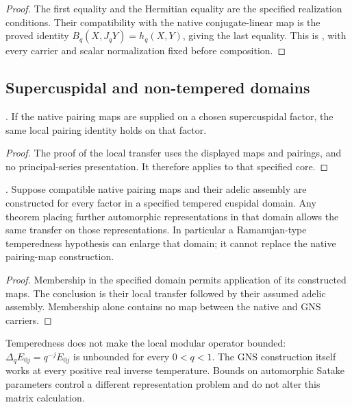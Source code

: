 \begin{proof}
The first equality and the Hermitian equality are the specified
realization conditions. Their compatibility with the native
conjugate-linear map is the proved identity
$B_q(X,J_qY)=h_q(X,Y)$, giving the last equality. This is
, with every carrier
and scalar normalization fixed before composition.
\end{proof}

\subsection{Supercuspidal and non-tempered domains}
\label{v4-arith:kms-gns:cycle2:supercuspidal}
\label{v4-arith:kms-gns:cycle2:ramanujan}

\begin{corollary}
\label{v4-arith:kms-gns:lem:supercuspidal}
\ClaimStatusProvedHereConditional. If the native pairing maps
are supplied on a chosen supercuspidal factor, the same local
pairing identity holds on that factor.
\end{corollary}
\begin{proof}
The proof of the local transfer uses the displayed maps and
pairings, and no principal-series presentation. It therefore
applies to that specified core.
\end{proof}

\begin{proposition}
\label{v4-arith:kms-gns:prop:non-tempered-residue}
\ClaimStatusProvedHereConditional. Suppose compatible native
pairing maps and their adelic assembly are constructed for every
factor in a specified tempered cuspidal domain. Any theorem
placing further automorphic representations in that domain allows
the same transfer on those representations. In particular a
Ramanujan-type temperedness hypothesis can enlarge that domain;
it cannot replace the native pairing-map construction.
\end{proposition}
\begin{proof}
Membership in the specified domain permits application of its
constructed maps. The conclusion is their local transfer followed
by their assumed adelic assembly. Membership alone contains no
map between the native and GNS carriers.
\end{proof}

\begin{remark}
\label{v4-arith:kms-gns:rem:partial-KS}
Temperedness does not make the local modular operator bounded:
$\Delta_qE_{0j}=q^{-j}E_{0j}$ is unbounded for every
$0<q<1$. The GNS construction itself works at every positive
real inverse temperature. Bounds on automorphic Satake parameters
control a different representation problem and do not alter this
matrix calculation.
\end{remark}

